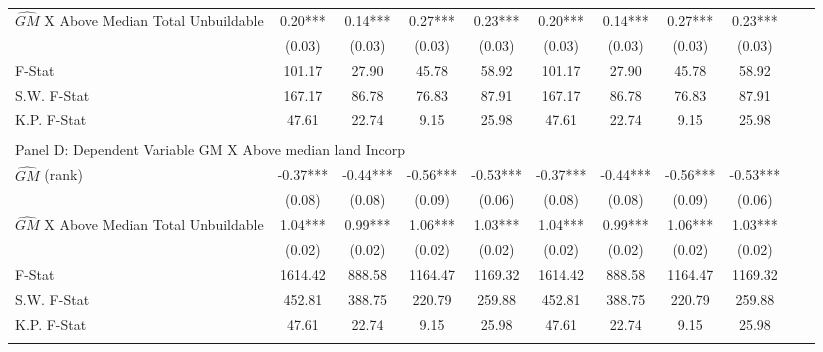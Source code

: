 \begin{table}[htbp]
\begin{threeparttable}
\begin{tabular}{l*{10}{c}}
\addlinespace
$\hat{GM}$ X Above Median Total Unbuildable&       0.20***&       0.14***&       0.27***&       0.23***&       0.20***&       0.14***&       0.27***&       0.23***\\
                &     (0.03)   &     (0.03)   &     (0.03)   &     (0.03)   &     (0.03)   &     (0.03)   &     (0.03)   &     (0.03)   \\
\midrule
F-Stat          &     101.17   &      27.90   &      45.78   &      58.92   &     101.17   &      27.90   &      45.78   &      58.92   \\
S.W. F-Stat     &     167.17   &      86.78   &      76.83   &      87.91   &     167.17   &      86.78   &      76.83   &      87.91   \\
K.P. F-Stat     &      47.61   &      22.74   &       9.15   &      25.98   &      47.61   &      22.74   &       9.15   &      25.98   \\
\cmidrule[\heavyrulewidth](lr){1-9} \\ \cmidrule[\heavyrulewidth](lr){1-9}
\multicolumn{8}{l}{Panel D: Dependent Variable GM X Above median land Incorp}\\
\cmidrule(lr){1-9}
$\hat{GM}$ (rank)&      -0.37***&      -0.44***&      -0.56***&      -0.53***&      -0.37***&      -0.44***&      -0.56***&      -0.53***\\
                &     (0.08)   &     (0.08)   &     (0.09)   &     (0.06)   &     (0.08)   &     (0.08)   &     (0.09)   &     (0.06)   \\
\addlinespace
$\hat{GM}$ X Above Median Total Unbuildable&       1.04***&       0.99***&       1.06***&       1.03***&       1.04***&       0.99***&       1.06***&       1.03***\\
                &     (0.02)   &     (0.02)   &     (0.02)   &     (0.02)   &     (0.02)   &     (0.02)   &     (0.02)   &     (0.02)   \\
\midrule
F-Stat          &    1614.42   &     888.58   &    1164.47   &    1169.32   &    1614.42   &     888.58   &    1164.47   &    1169.32   \\
S.W. F-Stat     &     452.81   &     388.75   &     220.79   &     259.88   &     452.81   &     388.75   &     220.79   &     259.88   \\
K.P. F-Stat     &      47.61   &      22.74   &       9.15   &      25.98   &      47.61   &      22.74   &       9.15   &      25.98   \\
\cmidrule[\heavyrulewidth](lr){1-9} \\ \cmidrule[\heavyrulewidth](lr){1-9}

\end{tabular}
\end{threeparttable}
\end{table}
